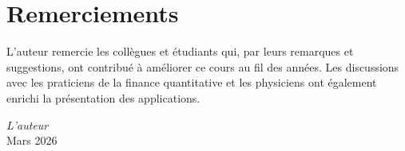 \section*{Remerciements}

L'auteur remercie les coll\`egues et \'etudiants qui, par leurs remarques et
suggestions, ont contribu\'e \`a am\'eliorer ce cours au fil des ann\'ees. Les
discussions avec les praticiens de la finance quantitative et les physiciens
ont \'egalement enrichi la pr\'esentation des applications.

\vfill

\begin{flushright}
\textit{L'auteur}\\
Mars 2026
\end{flushright}
